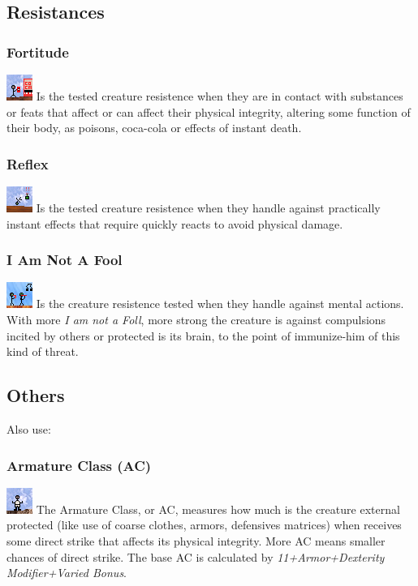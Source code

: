 \documentclass[ letterpaper,12pt]{article}
\begin{document}
\subsection{Resistances}

\subsubsection{Fortitude}
\includegraphics{../data/skills/Img/fortitude.png}
Is the tested creature resistence when they are in contact with substances or feats that affect or can affect their physical integrity, altering some function of their body, as poisons, coca-cola or effects of instant death.

\subsubsection{Reflex}
\includegraphics{../data/skills/Img/reflexos.png}
Is the tested creature resistence when they handle against practically instant effects that require quickly reacts to avoid physical damage.  

\subsubsection{I Am Not A Fool}
\includegraphics{../data/skills/Img/vontade.png}
Is the creature resistence tested when they handle against mental actions. With more {\it I am not a Foll}, more strong the creature is against compulsions incited by others or protected is its brain, to the point of immunize-him of this kind of threat.

\subsection{Others}
Also use:

\subsubsection{Armature Class (AC)}
\includegraphics{../data/skills/Img/ca.png}
The Armature Class, or AC, measures how much is the creature external protected (like use of coarse clothes, armors, defensives matrices) when receives some direct strike that affects its physical integrity. More AC means smaller chances of direct strike. The base AC is calculated by {\it 11+Armor+Dexterity Modifier+Varied Bonus}.
\end{document}
